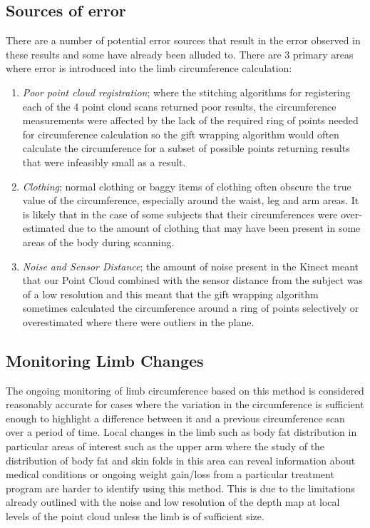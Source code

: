 \subsection{Sources of error}

There are a number of potential error sources that result in the error observed in these results and some have already been alluded to. There are 3 primary areas where error is introduced into the limb circumference calculation:

\begin{enumerate}
    \item \emph{Poor point cloud registration}; where the stitching algorithms for registering each of the 4 point cloud scans returned poor results, the circumference measurements were affected by the lack of the required ring of points needed for circumference calculation so the gift wrapping algorithm would often calculate the circumference for a subset of possible points returning results that were infeasibly small as a result.
    \item \emph{Clothing}; normal clothing or baggy items of clothing often obscure the true value of the circumference, especially around the waist, leg and arm areas. It is likely that in the case of some subjects that their circumferences were over-estimated due to the amount of clothing that may have been present in some areas of the body during scanning.
    \item \emph{Noise and Sensor Distance}; the amount of noise present in the Kinect meant that our Point Cloud combined with the sensor distance from the subject was of a low resolution and this meant that the gift wrapping algorithm sometimes calculated the circumference around a ring of points selectively or overestimated where there were outliers in the plane.
    
\end{enumerate}

\subsection{Monitoring Limb Changes}

The ongoing monitoring of limb circumference based on this method is considered reasonably accurate for cases where the variation in the circumference is sufficient enough to highlight a difference between it and a previous circumference scan over a period of time. Local changes in the limb such as body fat distribution in particular areas of interest such as the upper arm where the study of the distribution of body fat and skin folds in this area can reveal information about medical conditions or ongoing weight gain/loss from a particular treatment program are harder to identify using this method. This is due to the limitations already outlined with the noise and low resolution of the depth map at local levels of the point cloud unless the limb is of sufficient size.

\pagebreak